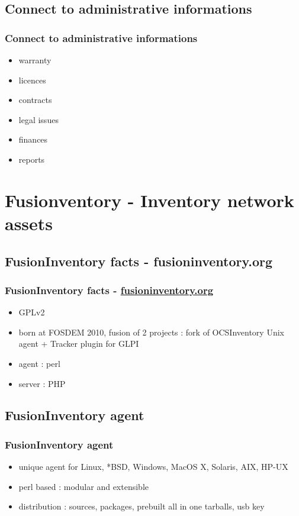 \documentclass{beamer}
\begin{document}
\subsection{Connect to administrative informations}
\begin{frame}
\frametitle{Connect to administrative informations}
%
\begin{itemize}
%
\item warranty
\item licences
\item contracts
\item legal issues
\item finances
\item reports
%
\end{itemize}
\end{frame}
\section{Fusionventory - Inventory network assets}
%
%
\subsection{FusionInventory facts - fusioninventory.org}
\begin{frame}
\frametitle{FusionInventory facts - \href{http://fusioninventory.org}{fusioninventory.org}}
%
\begin{itemize}
\item GPLv2
\item born at FOSDEM 2010, fusion of 2 projects : fork of OCSInventory Unix agent + Tracker plugin for GLPI
\item agent : perl
\item server : PHP
%
\end{itemize}
\end{frame}
\subsection{FusionInventory agent}
\begin{frame}
\frametitle{FusionInventory agent}
%
\begin{itemize}
%
\item unique agent for Linux, *BSD, Windows, MacOS X, Solaris, AIX, HP-UX
\item perl based : modular and extensible
\item distribution : sources, packages, prebuilt all in one tarballs, usb key
%
\end{itemize}
\end{frame}
\end{document}
